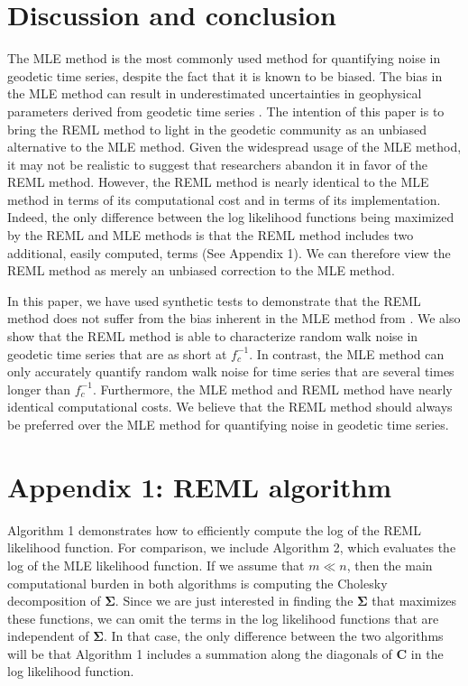 \documentclass{svjour3}                     %
\begin{document}
\section{Discussion and conclusion}\label{sec:conclusion}
The MLE method is the most commonly used method for quantifying noise in geodetic time series, despite the fact that it is known to be biased. The bias in the MLE method can result in underestimated uncertainties in geophysical parameters derived from geodetic time series \citep{Langbein2012}. The intention of this paper is to bring the REML method to light in the geodetic community as an unbiased alternative to the MLE method. Given the widespread usage of the MLE method, it may not be realistic to suggest that researchers abandon it in favor of the REML method.  However, the REML method is nearly identical to the MLE method in terms of its computational cost and in terms of its implementation. Indeed, the only difference between the log likelihood functions being maximized by the REML and MLE methods is that the REML method includes two additional, easily computed, terms (See Appendix 1). We can therefore view the REML method as merely an unbiased correction to the MLE method.     

In this paper, we have used synthetic tests to demonstrate that the REML method does not suffer from the bias inherent in the MLE method from \citet{Langbein1997}. We also show that the REML method is able to characterize random walk noise in geodetic time series that are as short at $f_c^{-1}$. In contrast, the MLE method can only accurately quantify random walk noise for time series that are several times longer than $f_c^{-1}$. Furthermore, the MLE method and REML method have nearly identical computational costs. We believe that the REML method should always be preferred over the MLE method for quantifying noise in geodetic time series. 

\begin{acknowledgements}
\end{acknowledgements}

\section*{Appendix 1: REML algorithm}

Algorithm 1 demonstrates how to efficiently compute the log of the REML likelihood function. For comparison, we include Algorithm 2, which evaluates the log of the MLE likelihood function. If we assume that $m \ll n$, then the main computational burden in both algorithms is computing the Cholesky decomposition of $\mathbf{\Sigma}$. Since we are just interested in finding the $\mathbf{\Sigma}$ that maximizes these functions, we can omit the terms in the log likelihood functions that are independent of $\mathbf{\Sigma}$. In that case, the only difference between the two algorithms will be that Algorithm 1 includes a summation along the diagonals of $\mathbf{C}$ in the log likelihood function.    
\end{document}
